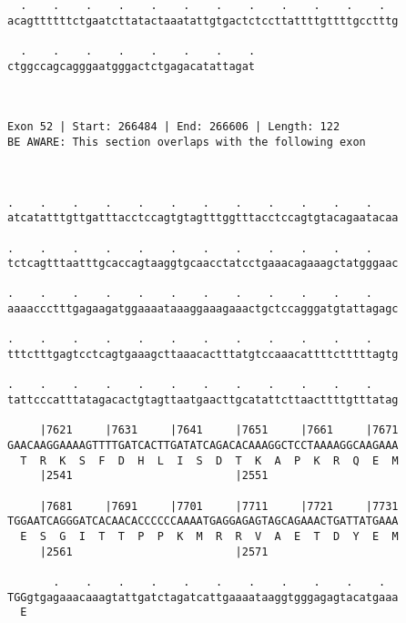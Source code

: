\documentclass{article}
\begin{document}
\begin{Verbatim}
  .    .    .    .    .    .    .    .    .    .    .    .  
acagttttttctgaatcttatactaaatattgtgactctccttattttgttttgcctttg
                                                            
  .    .    .    .    .    .    .    .
ctggccagcagggaatgggactctgagacatattagat
                                      
                                      
 
Exon 52 | Start: 266484 | End: 266606 | Length: 122
BE AWARE: This section overlaps with the following exon



.    .    .    .    .    .    .    .    .    .    .    .    
atcatatttgttgatttacctccagtgtagtttggtttacctccagtgtacagaatacaa
                                                            
.    .    .    .    .    .    .    .    .    .    .    .    
tctcagtttaatttgcaccagtaaggtgcaacctatcctgaaacagaaagctatgggaac
                                                            
.    .    .    .    .    .    .    .    .    .    .    .    
aaaaccctttgagaagatggaaaataaaggaaagaaactgctccagggatgtattagagc
                                                            
.    .    .    .    .    .    .    .    .    .    .    .    
tttctttgagtcctcagtgaaagcttaaacactttatgtccaaacattttctttttagtg
                                                            
.    .    .    .    .    .    .    .    .    .    .    .    
tattcccatttatagacactgtagttaatgaacttgcatattcttaacttttgtttatag
                                                            
     |7621     |7631     |7641     |7651     |7661     |7671
GAACAAGGAAAAGTTTTGATCACTTGATATCAGACACAAAGGCTCCTAAAAGGCAAGAAA
  T  R  K  S  F  D  H  L  I  S  D  T  K  A  P  K  R  Q  E  M
     |2541                         |2551                    
  
     |7681     |7691     |7701     |7711     |7721     |7731
TGGAATCAGGGATCACAACACCCCCCAAAATGAGGAGAGTAGCAGAAACTGATTATGAAA
  E  S  G  I  T  T  P  P  K  M  R  R  V  A  E  T  D  Y  E  M
     |2561                         |2571                    
  
       .    .    .    .    .    .    .    .    .    .    .  
TGGgtgagaaacaaagtattgatctagatcattgaaaataaggtgggagagtacatgaaa
  E                                                         
                                                            

\end{Verbatim}
\end{document}
